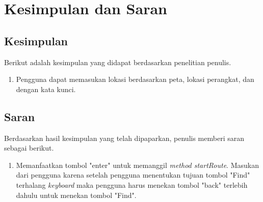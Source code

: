\chapter{Kesimpulan dan Saran}
\label{chap:Kesimpulan dan Saran}

\section{Kesimpulan}
\label{lab:Kesimpulan}
\hspace{0.5cm} Berikut adalah kesimpulan yang didapat berdasarkan penelitian penulis.
\begin{enumerate}
	\item Pengguna dapat memasukan lokasi berdasarkan peta, lokasi perangkat, dan dengan kata kunci.
\end{enumerate}

\section{Saran}
\label{lab:Saran}
\hspace{0.5cm} Berdasarkan hasil kesimpulan yang telah dipaparkan, penulis memberi saran sebagai berikut.
\begin{enumerate}
	\item Memanfaatkan tombol "enter" untuk memanggil \textit{method startRoute}. Masukan dari pengguna karena setelah pengguna menentukan tujuan tombol "Find" terhalang \textit{keyboard} maka pengguna harus menekan tombol "back" terlebih dahulu untuk menekan tombol "Find".
\end{enumerate}